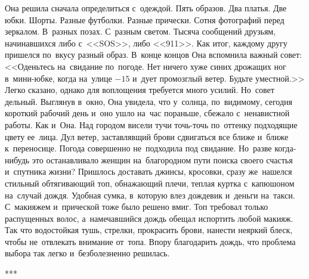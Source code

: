 Она решила сначала определиться с~одеждой.
Пять образов.
Два платья.
Две юбки.
Шорты.
Разные футболки.
Разные прически.
Сотня фотографий перед зеркалом.
В~разных позах.
С~разным светом.
Тысяча сообщений друзьям, начинавшихся либо с~<<SOS>>, либо <<911>>.
Как итог, каждому другу пришелся по~вкусу разный образ.
В~конце концов Она вспомнила важный совет: <<Оденьтесь на~свидание по~погоде.
Нет ничего хуже синих дрожащих ног в~мини-юбке, когда на~улице $-15$ и~дует промозглый ветер.
Будьте уместной.>>
Легко сказано, однако для воплощения требуется много усилий.
Но~совет дельный.
Выглянув в~окно, Она увидела, что у~солнца, по~видимому, сегодня короткий рабочий день и~оно ушло на~час пораньше, сбежало с~ненавистной работы.
Как и~Она.
Над городом висели тучи точь-точь по~оттенку подходящие цвету ее~лица.
Дул ветер, заставлявщий брови сдвигаться все ближе и~ближе к~переносице.
Погода совершенно не~подходила под свидание.
Но~разве когда-нибудь это останавливало женщин на~благородном пути поиска своего счастья и~спутника жизни? Пришлось доставать джинсы, кросовки, сразу же~нашелся стильный обтягивающий топ, обнажающий плечи, теплая куртка с~капюшоном на~случай дождя.
Удобная сумка, в~которую влез дождевик и~деньги на~такси.
С~макияжем и~прической тоже было решено вмиг.
Топ требовал только распущенных волос, а~намечавшийся дождь обещал испортить любой макияж.
Так что водостойкая тушь, стрелки, прокрасить брови, нанести неяркий блеск, чтобы не~отвлекать внимание от~топа.
Впору благодарить дождь, что проблема выбора так легко и~безболезненно решилась.

\begin{center}
***
\end{center}

